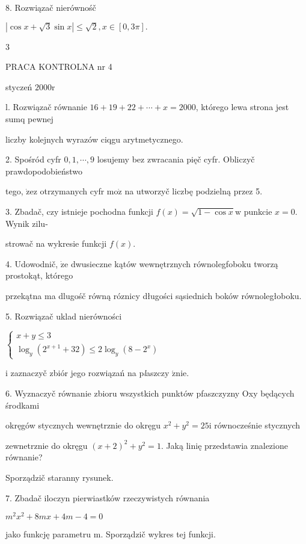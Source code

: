 \documentclass[a4paper,12pt]{article}
\begin{document}
8. Rozwiązač nierównośč

$|\cos x+\sqrt{3}\sin x|\leq\sqrt{2},x\in[0,3\pi].$

3





PRACA KONTROLNA nr 4

styczeń $2000\mathrm{r}$

l. Rozwiązač równanie $16+19+22+\cdots+x=2000$, którego lewa strona jest sumq pewnej

liczby kolejnych wyrazów ciqgu arytmetycznego.

2. Spośród cyfr $0,1,\cdots,9$ losujemy bez zwracania pięč cyfr. Obliczyč prawdopodobieństwo

tego, $\dot{\mathrm{z}}\mathrm{e}\mathrm{z}$ otrzymanych cyfr $\mathrm{m}\mathrm{o}\dot{\mathrm{z}}$ na utworzyč liczbę podzielną przez 5.

3. Zbadač, czy istnieje pochodna funkcji $f(x)=\sqrt{1-\cos x}\mathrm{w}$ punkcie $x=0$. Wynik zilu-

strowač na wykresie funkcji $f(x).$

4. Udowodnič, $\dot{\mathrm{z}}\mathrm{e}$ dwusieczne kątów wewnętrznych równolegfoboku tworzą prostokąt, którego

przekątna ma dlugośč równą róznicy długości sąsiednich boków równoległoboku.

5. Rozwiązač uklad nierówności

$\left\{\begin{array}{l}
x+y\leq 3\\
\log_{y}(2^{x+1}+32)\leq 2\log_{y}(8-2^{x})
\end{array}\right.$

$\mathrm{i}$ zaznaczyč zbiór jego rozwiązań na p{\it l}aszczy $\acute{\mathrm{z}}\mathrm{n}\mathrm{i}\mathrm{e}.$

6. Wyznaczyč równanie zbioru wszystkich punktów pfaszczyzny Oxy będących środkami

okręgów stycznych wewnętrznie do okręgu $x^{2} +y^{2} = 25 \mathrm{i}$ równocześnie stycznych

zewnetrznie do okręgu $(x+2)^{2}+y^{2}= 1$. Jaką linię przedstawia znalezione równanie?

Sporządzič staranny rysunek.

7. Zbadač iloczyn pierwiastków rzeczywistych równania

$m^{2}x^{2}+8mx+4m-4=0$

jako funkcję parametru $\mathrm{m}$. Sporządzič wykres tej funkcji.
\end{document}
